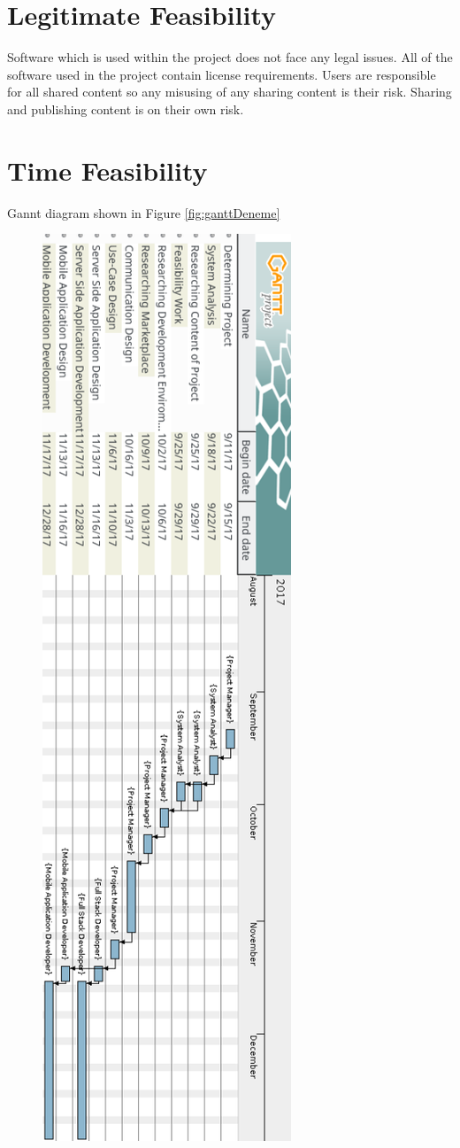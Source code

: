 \section{Legitimate Feasibility}
Software which is used within the project does not face any legal issues. All of the
software used in the project contain license requirements. Users are responsible for
all shared content so any misusing of any sharing content is their risk. Sharing and publishing content is on their own risk.

\newpage
\section{Time Feasibility}
Gannt diagram shown in Figure \ref{fig:ganttDeneme}
\begin{figure}[!htbp]
\centering
\includegraphics[scale= 0.75]{projectChapters/images/gant.png}

\end{figure}
